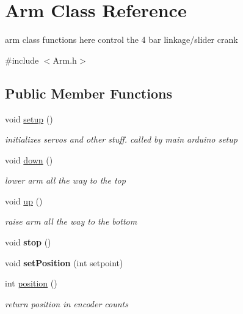 \hypertarget{classArm}{\section{Arm Class Reference}
\label{classArm}
}


arm class functions here control the 4 bar linkage/slider crank  




{\ttfamily \#include $<$Arm.\-h$>$}

\subsection*{Public Member Functions}
\begin{DoxyCompactItemize}
\item 
\hypertarget{classArm_a0e642e1a6fc24f40268f2c759dee62e1}{void \hyperlink{classArm_a0e642e1a6fc24f40268f2c759dee62e1}{setup} ()}\label{classArm_a0e642e1a6fc24f40268f2c759dee62e1}

\begin{DoxyCompactList}\small\item\em initializes servos and other stuff. called by main arduino setup \end{DoxyCompactList}\item 
\hypertarget{classArm_a9075166ca53ef3cd547a7725ee5bca1d}{void \hyperlink{classArm_a9075166ca53ef3cd547a7725ee5bca1d}{down} ()}\label{classArm_a9075166ca53ef3cd547a7725ee5bca1d}

\begin{DoxyCompactList}\small\item\em lower arm all the way to the top \end{DoxyCompactList}\item 
\hypertarget{classArm_a65ffd463407a6782a55dbd5b84f1e15e}{void \hyperlink{classArm_a65ffd463407a6782a55dbd5b84f1e15e}{up} ()}\label{classArm_a65ffd463407a6782a55dbd5b84f1e15e}

\begin{DoxyCompactList}\small\item\em raise arm all the way to the bottom \end{DoxyCompactList}\item 
\hypertarget{classArm_a4a8274680d981524efbeb2b51eb49c28}{void {\bfseries stop} ()}\label{classArm_a4a8274680d981524efbeb2b51eb49c28}

\item 
\hypertarget{classArm_a720cd8598fb21b6382f48acd9d3583eb}{void {\bfseries set\-Position} (int setpoint)}\label{classArm_a720cd8598fb21b6382f48acd9d3583eb}

\item 
\hypertarget{classArm_ab49756ee4bfdc5f573a78f29678bf1d8}{int \hyperlink{classArm_ab49756ee4bfdc5f573a78f29678bf1d8}{position} ()}\label{classArm_ab49756ee4bfdc5f573a78f29678bf1d8}

\begin{DoxyCompactList}\small\item\em return position in encoder counts \end{DoxyCompactList}\end{DoxyCompactItemize}
